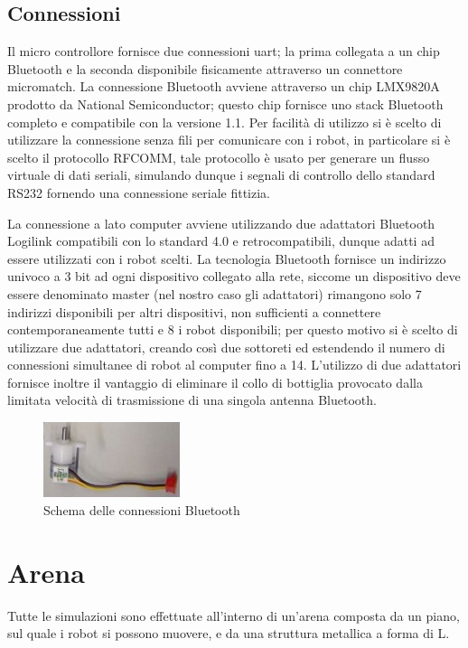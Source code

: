 	\subsection{Connessioni}
	Il micro controllore fornisce due connessioni uart; la prima collegata a un chip Bluetooth e la seconda disponibile fisicamente attraverso un connettore micromatch.
	La connessione Bluetooth avviene attraverso un chip  LMX9820A prodotto da National Semiconductor; questo chip fornisce uno stack Bluetooth completo e compatibile con la versione 1.1.
	Per facilit\`a di utilizzo si \`e scelto di utilizzare la connessione senza fili per comunicare con i robot, in particolare si \`e scelto il protocollo RFCOMM, tale protocollo \`e usato per generare un flusso virtuale di dati seriali, simulando dunque i segnali di controllo dello standard RS232 fornendo una connessione seriale fittizia.
	
	La connessione a lato computer avviene utilizzando due adattatori Bluetooth Logilink compatibili con lo standard 4.0 e retrocompatibili, dunque adatti ad essere utilizzati con i robot scelti.
	La tecnologia Bluetooth fornisce un indirizzo univoco a 3 bit ad ogni dispositivo collegato alla rete, siccome un dispositivo deve essere denominato master (nel nostro caso gli adattatori) rimangono solo 7 indirizzi disponibili per altri dispositivi, non sufficienti a connettere contemporaneamente tutti e 8 i robot disponibili; per questo motivo si \`e scelto di utilizzare due adattatori, creando così due sottoreti ed estendendo il numero di connessioni simultanee di robot al computer fino a 14.
	L'utilizzo di due adattatori fornisce inoltre il vantaggio di eliminare il collo di bottiglia provocato dalla limitata velocit\`a di trasmissione di una singola antenna Bluetooth.
	\begin{figure}[h]
	\centering
	\includegraphics[width=4cm]{images/motor+cable}
	\caption{Schema delle connessioni Bluetooth\label{Bt}}
	\end{figure}
\clearpage	   	
\section{Arena}
	Tutte le simulazioni sono effettuate all'interno di un'arena composta da un piano, sul quale i robot si possono muovere, e da una struttura metallica a forma di L.
	
